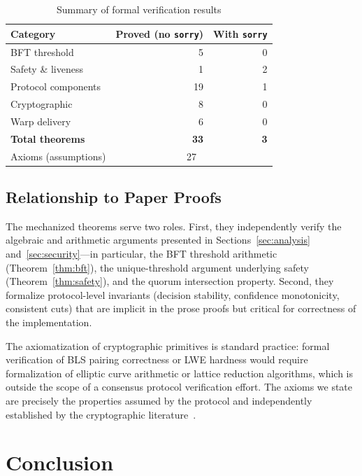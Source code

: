 \documentclass[11pt,a4paper]{article}
\begin{document}
\begin{table}[h]
\centering
\caption{Summary of formal verification results}
\label{tab:formal-summary}
\begin{tabular}{@{}lrr@{}}
\toprule
Category & Proved (no \texttt{sorry}) & With \texttt{sorry} \\
\midrule
BFT threshold & 5 & 0 \\
Safety \& liveness & 1 & 2 \\
Protocol components & 19 & 1 \\
Cryptographic & 8 & 0 \\
Warp delivery & 6 & 0 \\
\midrule
\textbf{Total theorems} & \textbf{33} & \textbf{3} \\
Axioms (assumptions) & \multicolumn{2}{c}{27} \\
\bottomrule
\end{tabular}
\end{table}

\subsection{Relationship to Paper Proofs}

The mechanized theorems serve two roles. First, they independently verify the
algebraic and arithmetic arguments presented in Sections~\ref{sec:analysis}
and~\ref{sec:security}---in particular, the BFT threshold arithmetic
(Theorem~\ref{thm:bft}), the unique-threshold argument underlying safety
(Theorem~\ref{thm:safety}), and the quorum intersection property. Second, they
formalize protocol-level invariants (decision stability, confidence monotonicity,
consistent cuts) that are implicit in the prose proofs but critical for correctness
of the implementation.

The axiomatization of cryptographic primitives is standard practice: formal
verification of BLS pairing correctness or LWE hardness would require formalization
of elliptic curve arithmetic or lattice reduction algorithms, which is outside the
scope of a consensus protocol verification effort. The axioms we state are precisely
the properties assumed by the protocol and independently established by the
cryptographic literature~\cite{boneh2001short,komlo2020frost,ducas2018crystals}.

\section{Conclusion}
\label{sec:conclusion}
\end{document}
